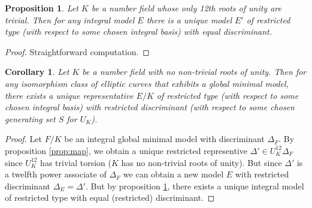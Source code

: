 \documentclass{amsart}
\newtheorem{proposition}{Proposition}
\newtheorem{corollary}{Corollary}
\begin{document}
\begin{proposition}\label{prop:uniq}
  Let $K$ be a number field whose only 12th roots of unity
  are trivial. Then for any integral model $E$ there is a unique model $E'$ of
  restricted type (with respect to some chosen integral basis) with equal
  discriminant.
\end{proposition}

\begin{proof}
  Straightforward computation.
\end{proof}


\begin{corollary}
  Let $K$ be a number field with no non-trivial roots of unity. Then for any
  isomorphism class of elliptic curves that exhibits a global minimal model,
  there exists a unique representative $E/K$ of restricted type (with respect
  to some chosen integral basis) with restricted discriminant (with respect to
  some chosen generating set $S$ for $U_K$).
\end{corollary}
\begin{proof}
  Let $F/K$ be an integral global minimal model with discriminant $\Delta_F$.
  By proposition \ref{prop:map}, we obtain a unique
  restricted representive $\Delta' \in U_K^{12}\Delta_F$ since $U_K^{12}$ has
  trivial torsion ($K$ has no non-trivial roots of unity). But since $\Delta'$
  is a twelfth power associate of $\Delta_F$ we can obtain a new model $E$
  with restricted discriminant $\Delta_E=\Delta'$. But by proposition
  \ref{prop:uniq}, there exists a unique integral model of restricted type with
  equal (restricted) discriminant.
\end{proof}
\end{document}
